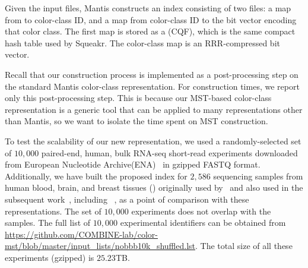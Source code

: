 Given the input files, Mantis constructs an index consisting of two
files: a map from \kmer to color-class ID, and a map from color-class
ID to the bit vector encoding that color class.  The first map is
stored as a  (CQF), which is the same
compact hash table used by Squeakr.  The color-class map is an
RRR-compressed bit vector.

Recall that our construction process is implemented as a
post-processing step on the standard Mantis color-class
representation.  For construction times, we report only this
post-processing step.  This is because our MST-based color-class
representation is a generic tool that can be applied to many \cdbg
representations other than Mantis, so we want to isolate the time
spent on MST construction.

To test the scalability of our new \cc representation, we used a
randomly-selected set of $10,000$ paired-end, human, bulk RNA-seq short-read
experiments downloaded from European Nucleotide Archive(ENA)~\citep{nih-sra} in
gzipped FASTQ format. Additionally, we have built the proposed index for
$2,586$ sequencing samples from human blood, brain, and breast tissues (\bbb)
originally used by~\cite{Solomon2016Fast} and also used in the subsequent
work~\citep{Solomon2017Improved,Sun2017Allsome,seqothello}, including
\prevsys~\citep{mantis}, as a point of comparison with these representations.
The set of $10,000$ experiments does not overlap with the \bbb samples.
The full list of $10,000$ experimental identifiers can be obtained from
\url{https://github.com/COMBINE-lab/color-mst/blob/master/input_lists/nobbb10k_shuffled.lst}.
The total size of all these experiments (gzipped) is $25.23$TB.


